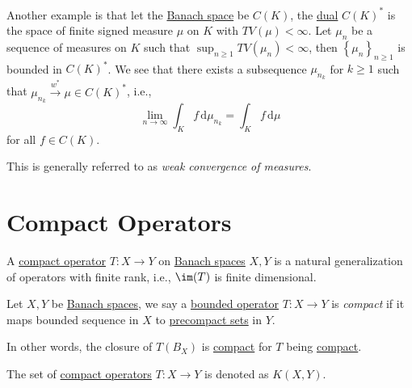 Another example is that let the \hyperref[def:Banach-space]{Banach space} be \(C(K)\), the \hyperref[def:dual-space]{dual} \(C(K)^{\ast} \) is the space of finite signed measure \(\mu\) on \(K\) with \(TV(\mu )< \infty \). Let \(\mu _n\) be a sequence of measures on \(K\) such that \(\sup _{n\geq 1} TV(\mu _n) < \infty \), then \(\left\{ \mu _n \right\}_{n\geq 1} \) is bounded in \(C(K)^{\ast} \). We see that there exists a subsequence \(\mu _{n_k}\) for \(k\geq 1\) such that \(\mu _{n_k}\overset{w^{\ast} }{\to } \mu \in C(K)^{\ast} \), i.e.,
\[
	\lim_{n \to \infty} \int _K f\,\mathrm{d} \mu _{n_k} = \int _K f\,\mathrm{d} \mu
\]
for all \(f\in C(K)\).

\begin{note}
	This is generally referred to as \emph{weak convergence of measures}.
\end{note}

\chapter{Compact Operators}
A \hyperref[def:compact-op]{compact operator} \(T\colon X\to Y\) on \hyperref[def:Banach-space]{Banach spaces} \(X, Y\) is a natural generalization of operators with finite rank, i.e., \(\im(T)\) is finite dimensional.

\begin{definition}\label{def:compact-op}
	Let \(X, Y\) be \hyperref[def:Banach-space]{Banach spaces}, we say a \hyperref[def:bounded-map]{bounded operator} \(T\colon X\to Y\) is \emph{compact} if it maps bounded sequence in \(X\) to \hyperref[def:precompact]{precompact sets} in \(Y\).
\end{definition}

In other words, the closure of \(T(B_X)\) is \hyperref[def:compact]{compact} for \(T\) being \hyperref[def:compact-op]{compact}.

\begin{notation}
	The set of \hyperref[def:compact-op]{compact operators} \(T\colon X\to Y\) is denoted as \(K(X, Y)\).
\end{notation}

